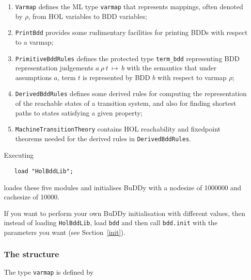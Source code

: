 \documentclass[12pt,fleqn]{book}
\renewcommand{\t}[1]{\mbox{\tt #1}}
\newcommand{\termbdd}[4]{\mbox{$#1~#2~#3~\mapsto~#4$}}
\newcommand\termbddty{\texttt{term\_bdd}{}}
\newcommand{\Buddy}{BuDDy{}}
\begin{document}
\begin{enumerate}
\item \t{Varmap} defines the ML type \t{varmap} that represents mappings,
often denoted by $\rho$,
from HOL variables to BDD variables;

\item \t{PrintBdd} provides some rudimentary facilities for printing
BDDs with respect to a varmap;

\item \t{PrimitiveBddRules} defines the protected type \termbddty
representing BDD representation judgements \termbdd{a}{\rho}{t}{b}
with the semantics that under assumptions $a$, term $t$ is represented by BDD $b$ with respect to
varmap $\rho$;

\item \t{DerivedBddRules} defines some derived rules for computing
the representation of the reachable states of a transition system,
and also for finding shortest paths to states  satisfying a given property;

\item \t{MachineTransitionTheory} contains HOL reachability and fixedpoint theorems needed
for the derived rules in  \t{DerivedBddRules}.


\end{enumerate}


Executing

\vspace*{-2mm}

\begin{verbatim}
   load "HolBddLib";
\end{verbatim}

\vspace*{-2mm}

loades these five modules and
initialises \Buddy{} with a nodesize of 1000000
and cachesize of 10000.  

If you want to perform your own \Buddy{} initialisation with different
values, then instead of loading \t{HolBddLib}, load \t{bdd} and then
call \t{bdd.init} with the parameters you want (see Section~\ref{init}).  

\subsubsection{The structure }\label{Varmap}

The type \t{varmap} is defined by

\vspace*{-2mm}
\end{document}
